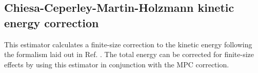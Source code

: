 

\subsection{Chiesa-Ceperley-Martin-Holzmann kinetic energy correction}

This estimator calculates a finite-size correction to the kinetic energy following the formalism laid out in Ref. \cite{Chiesa2006}.  The total energy can be corrected for finite-size effects by using this estimator in conjunction with the MPC correction.

